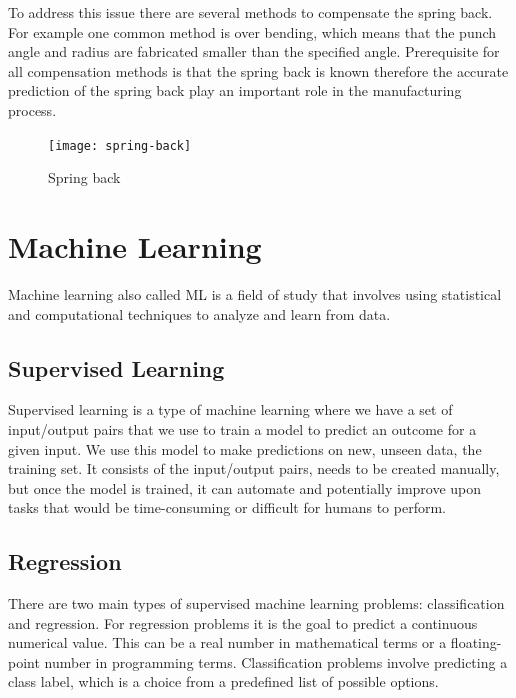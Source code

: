 To address this issue there are several methods to compensate the spring back. For
example one
common method is over bending, which means that the punch angle and radius are
fabricated smaller
than the specified angle.
\cite[p. 114]{groover_fundamentalsmodernmanufacturing_2020}
Prerequisite for all compensation methods is that the spring back is known therefore
the accurate
prediction of the spring back play an important role in the manufacturing process.

\begin{figure}[h]
    \centering
    \texttt{[image: spring-back]}
    \caption{Spring back \cite[p. 5]{cruz_applicationmachinelearning_2021}}
    \label{fig:spring-back}
\end{figure}


\section{Machine Learning}\label{sec:machine-learning}
Machine learning also called \ac{ML} is a field of study that involves using
statistical and
computational techniques to analyze and learn from data. \cite[p.
1]{muller_introductionmachinelearning_2016}

\subsection{Supervised Learning}\label{subsec:supervised-learning}
Supervised learning is a type of machine learning where we have a set of input/output
pairs that
we use to train a model to predict an outcome for a given input. We use this model to make
predictions on new, unseen data, the training set. It consists of the input/output
pairs, needs
to be created manually, but once the model is trained, it can automate and potentially
improve
upon tasks that would be time-consuming or difficult for humans to perform. \cite[p.
25]{muller_introductionmachinelearning_2016}

\subsection{Regression}\label{subsec:regression}
There are two main types of supervised machine learning problems: classification and
regression.
For regression problems it is the goal to predict a continuous numerical value. This
can be a
real number in mathematical terms or a floating-point number in programming terms.
\cite[p. 226]{muller_introductionmachinelearning_2016}
Classification problems involve predicting a class label, which is a choice from a
predefined
list of possible options. \cite[p. 25]{muller_introductionmachinelearning_2016}

